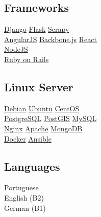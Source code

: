 \documentclass[]{joaosoares-resume}
\begin{document}
\begin{minipage}[t]{0.39\textwidth}
\subsection{Frameworks}
\href{https://www.djangoproject.com/}{Django} \textbullet{}
\href{http://flask.pocoo.org/}{Flask} \textbullet{}
\href{https://scrapy.org/}{Scrapy} \\
\href{https://angularjs.org}{AngularJS} \textbullet{}
\href{https://backbonejs.org/}{Backbone.js} \textbullet{}
\href{https://reactjs.org/}{React} \\
\href{https://nodejs.org/en/}{NodeJS} \\
\href{https://rubyonrails.org/}{Ruby on Rails} \\
\sectionsep

\subsection{Linux Server}
\href{http://www.debian.org/}{Debian}\textbullet{}
\href{http://www.ubuntu.com/}{Ubuntu}\textbullet{}
\href{http://www.centos.org/}{CentOS}\\
\href{http://www.postgresql.org/}{PostgreSQL}\textbullet{}
\href{http://www.postgis.net}{PostGIS}\textbullet{}
\href{https://www.mysql.com/}{MySQL}\\
\href{https://www.nginx.com/resources/wiki/}{Nginx}\textbullet{}
\href{http://httpd.apache.org/}{Apache} \textbullet{}
\href{https://www.mongodb.com/}{MongoDB} \\
\href{http://www.docker.com/}{Docker} \textbullet{}
\href{https://www.ansible.com/}{Ansible} \\
\sectionsep

\subsection{Languages}
Portuguese \\
English (B2) \\
German (B1)
\sectionsep


\end{minipage}
\end{document}
